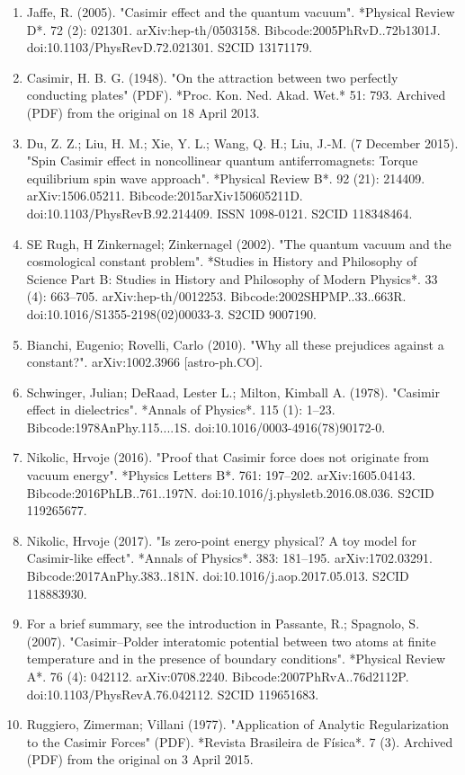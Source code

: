 \begin{enumerate}
\item Jaffe, R. (2005). "Casimir effect and the quantum vacuum". *Physical Review D*. 72 (2): 021301. arXiv:hep-th/0503158. Bibcode:2005PhRvD..72b1301J. doi:10.1103/PhysRevD.72.021301. S2CID 13171179.
\item Casimir, H. B. G. (1948). "On the attraction between two perfectly conducting plates" (PDF). *Proc. Kon. Ned. Akad. Wet.* 51: 793. Archived (PDF) from the original on 18 April 2013.
\item Du, Z. Z.; Liu, H. M.; Xie, Y. L.; Wang, Q. H.; Liu, J.-M. (7 December 2015). "Spin Casimir effect in noncollinear quantum antiferromagnets: Torque equilibrium spin wave approach". *Physical Review B*. 92 (21): 214409. arXiv:1506.05211. Bibcode:2015arXiv150605211D. doi:10.1103/PhysRevB.92.214409. ISSN 1098-0121. S2CID 118348464.
\item SE Rugh, H Zinkernagel; Zinkernagel (2002). "The quantum vacuum and the cosmological constant problem". *Studies in History and Philosophy of Science Part B: Studies in History and Philosophy of Modern Physics*. 33 (4): 663–705. arXiv:hep-th/0012253. Bibcode:2002SHPMP..33..663R. doi:10.1016/S1355-2198(02)00033-3. S2CID 9007190.
\item Bianchi, Eugenio; Rovelli, Carlo (2010). "Why all these prejudices against a constant?". arXiv:1002.3966 [astro-ph.CO].
\item Schwinger, Julian; DeRaad, Lester L.; Milton, Kimball A. (1978). "Casimir effect in dielectrics". *Annals of Physics*. 115 (1): 1–23. Bibcode:1978AnPhy.115....1S. doi:10.1016/0003-4916(78)90172-0.
\item Nikolic, Hrvoje (2016). "Proof that Casimir force does not originate from vacuum energy". *Physics Letters B*. 761: 197–202. arXiv:1605.04143. Bibcode:2016PhLB..761..197N. doi:10.1016/j.physletb.2016.08.036. S2CID 119265677.
\item Nikolic, Hrvoje (2017). "Is zero-point energy physical? A toy model for Casimir-like effect". *Annals of Physics*. 383: 181–195. arXiv:1702.03291. Bibcode:2017AnPhy.383..181N. doi:10.1016/j.aop.2017.05.013. S2CID 118883930.
\item For a brief summary, see the introduction in Passante, R.; Spagnolo, S. (2007). "Casimir–Polder interatomic potential between two atoms at finite temperature and in the presence of boundary conditions". *Physical Review A*. 76 (4): 042112. arXiv:0708.2240. Bibcode:2007PhRvA..76d2112P. doi:10.1103/PhysRevA.76.042112. S2CID 119651683.
\item Ruggiero, Zimerman; Villani (1977). "Application of Analytic Regularization to the Casimir Forces" (PDF). *Revista Brasileira de Física*. 7 (3). Archived (PDF) from the original on 3 April 2015.

\end{enumerate}
